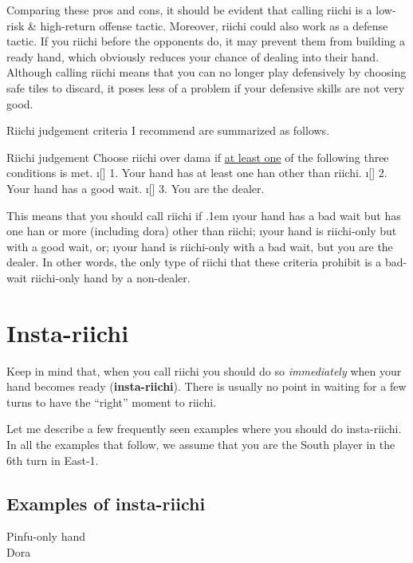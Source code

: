 \bigskip
\noindent
Comparing these pros and cons, it should be evident that calling riichi is a low-risk \& high-return offense tactic.
Moreover, riichi could also work as a defense tactic. If you riichi before the opponents do, it may prevent them from building a ready hand, which obviously reduces your chance of dealing into their hand.
Although calling riichi means that you can no longer play defensively by choosing safe tiles to discard, it poses less of a problem if your defensive skills are not very good.

\bigskip

Riichi judgement criteria I recommend are summarized as follows.

\bigskip
\begin{itembox}[c]{Riichi judgement}
Choose riichi over {\jap dama} if \underline{\large at least one} of the following three conditions is met.
\bi
\i[] 1. Your hand has at least one {\jap han} other than riichi.
\i[] 2. Your hand has a good wait.
\i[] 3. You are the dealer.
\ei \vsps
\end{itembox}

\bigskip

\noindent This means that you should call riichi if
\bi \itemsep.1em
\i your hand has a bad wait but has one {\jap han} or more (including {\jap dora}) other than riichi;
\i your hand is riichi-only but with a good wait, or;
\i your hand is riichi-only with a bad wait, but you are the dealer.
\ei
In other words, the only type of riichi that these criteria prohibit is a bad-wait riichi-only hand by a non-dealer.

\newpage
\section{Insta-riichi} 	
Keep in mind that, when you call riichi you should do so \emph{immediately} when your hand becomes ready ({\bf insta-riichi}). There is usually no point in waiting for a few turns to have the ``right'' moment to riichi.

\bigskip
Let me describe a few frequently seen examples where you should do insta-riichi.
In all the examples that follow, we assume that you are the South player in the 6th turn in East-1.

\subsection{Examples of insta-riichi}

\begin{itembox}[r]{{\jap Pinfu}-only hand}
\bp
{}~~\bei\\
\hfill\footnotesize{{\jap Dora}~~~~~~~}
\ep {}
\vspace{-15pt}
\end{itembox}

